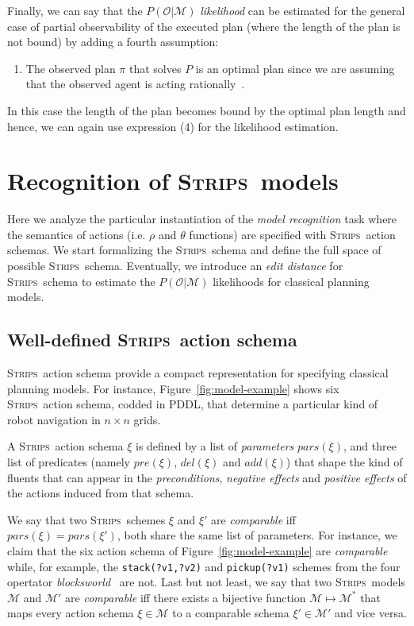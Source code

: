 \documentclass[letterpaper]{article} %
\newcommand{\strips}{\textsc{Strips}}     %
\begin{document}
Finally, we can say that the $P(\mathcal{O}|\mathcal{M})$ {\em likelihood} can be estimated for the general case of partial observability of the executed plan (where the length of the plan is not bound) by adding a fourth assumption:
\begin{enumerate}\addtocounter{enumi}{3}
\item The observed plan $\pi$ that solves $P$ is an optimal plan since we are assuming that the observed agent is acting rationally~\cite{ramirez2012plan}.
\end{enumerate}
In this case the length of the plan becomes bound by the optimal plan length and hence, we can again use expression (4) for the  likelihood estimation.





\section{Recognition of \strips\ models}
\label{sec:asPlanning}
Here we analyze the particular instantiation of the {\em model recognition} task where the semantics of actions (i.e. $\rho$ and $\theta$ functions) are specified with \strips\ action schemas. We start formalizing the \strips\ schema and define the full space of possible \strips\ schema. Eventually, we introduce an {\em edit distance} for \strips\ schema to estimate the $P(\mathcal{O}|\mathcal{M})$ likelihoods for classical planning models.

\subsection{Well-defined \strips\ action schema}
\strips\ action schema provide a compact representation for specifying classical planning models. For instance, Figure~\ref{fig:model-example} shows six \strips\ action schema, codded in PDDL, that determine a particular kind of robot navigation in $n\times n$ grids.

A \strips\ action schema $\xi$ is defined by a list of {\em parameters} $pars(\xi)$, and three list of predicates (namely $pre(\xi)$, $del(\xi)$ and $add(\xi)$) that shape the kind of fluents that can appear in the {\em preconditions}, {\em negative effects} and {\em positive effects} of the actions induced from that schema.

We say that two \strips\ schemes $\xi$ and $\xi'$ are {\em comparable} iff $pars(\xi)=pars(\xi')$, both share the same list of parameters. For instance, we claim that the six action schema of Figure~\ref{fig:model-example} are {\em comparable} while, for example, the {\small\tt stack(?v1,?v2)} and {\small\tt pickup(?v1)} schemes from the four opertator {\em blocksworld}~\cite{slaney2001blocks} are not. Last but not least, we say that two \strips\ models $\mathcal{M}$ and $\mathcal{M}'$ are {\em comparable} iff there exists a bijective function $\mathcal{M} \mapsto \mathcal{M}^*$ that maps every action schema $\xi\in\mathcal{M}$ to a comparable schema $\xi'\in\mathcal{M'}$ and vice versa.
\end{document}
